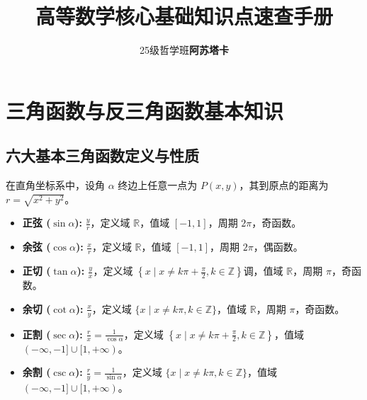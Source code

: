 \documentclass{article}
\title{\textbf{高等数学核心基础知识点速查手册}}
\author{25级哲学班\textbf{阿苏塔卡}}
\date{}
\begin{document}
\maketitle
\thispagestyle{empty} %

\section{三角函数与反三角函数基本知识}
\subsection{六大基本三角函数定义与性质}
在直角坐标系中，设角 $\alpha$ 终边上任意一点为 $P(x, y)$，其到原点的距离为 $r = \sqrt{x^2+y^2}$。
\begin{itemize}[leftmargin=1.5em, itemsep=0.1em]
    \item \textbf{正弦 ($\sin\alpha$):} $\frac{y}{r}$，定义域 $\mathbb{R}$，值域 $[-1, 1]$，周期 $2\pi$，奇函数。
    \item \textbf{余弦 ($\cos\alpha$):} $\frac{x}{r}$，定义域 $\mathbb{R}$，值域 $[-1, 1]$，周期 $2\pi$，偶函数。
    \item \textbf{正切 ($\tan\alpha$):} $\frac{y}{x}$，定义域 $\left\{x \mid x \neq k\pi + \frac{\pi}{2}, k \in \mathbb{Z}\right\}$调，值域 $\mathbb{R}$，周期 $\pi$，奇函数。
    \item \textbf{余切 ($\cot\alpha$):} $\frac{x}{y}$，定义域 $\{x \mid x \neq k\pi, k \in \mathbb{Z}\}$，值域 $\mathbb{R}$，周期 $\pi$，奇函数。
    \item \textbf{正割 ($\sec\alpha$):} $\frac{r}{x} = \frac{1}{\cos\alpha}$，定义域 $\left\{x \mid x \neq k\pi + \frac{\pi}{2}, k \in \mathbb{Z}\right\}$，值域 $(-\infty, -1] \cup [1, +\infty)$。
    \item \textbf{余割 ($\csc\alpha$):} $\frac{r}{y} = \frac{1}{\sin\alpha}$，定义域 $\{x \mid x \neq k\pi, k \in \mathbb{Z}\}$，值域 $(-\infty, -1] \cup [1, +\infty)$。
\end{itemize}
\end{document}
